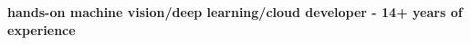 \onehalfspace
\textbf{\large hands-on machine vision/deep learning/cloud developer - 14+ years of experience}
\singlespace

\vspace{0.8cm}
